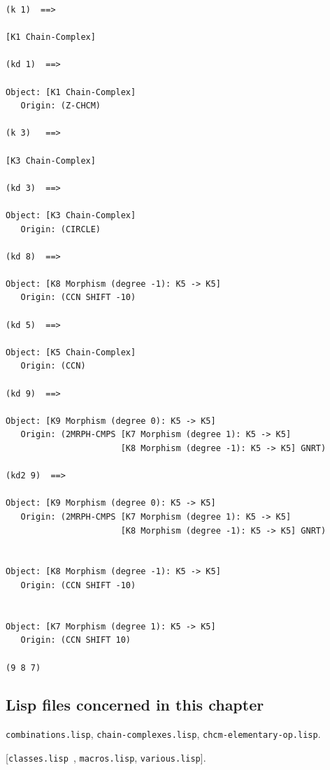 {\footnotesize\begin{verbatim}
(k 1)  ==>

[K1 Chain-Complex]

(kd 1)  ==>

Object: [K1 Chain-Complex]
   Origin: (Z-CHCM)

(k 3)   ==>

[K3 Chain-Complex]

(kd 3)  ==>

Object: [K3 Chain-Complex]
   Origin: (CIRCLE)

(kd 8)  ==>

Object: [K8 Morphism (degree -1): K5 -> K5]
   Origin: (CCN SHIFT -10)

(kd 5)  ==>

Object: [K5 Chain-Complex]
   Origin: (CCN)

(kd 9)  ==>

Object: [K9 Morphism (degree 0): K5 -> K5]
   Origin: (2MRPH-CMPS [K7 Morphism (degree 1): K5 -> K5] 
                       [K8 Morphism (degree -1): K5 -> K5] GNRT)

(kd2 9)  ==>

Object: [K9 Morphism (degree 0): K5 -> K5]
   Origin: (2MRPH-CMPS [K7 Morphism (degree 1): K5 -> K5] 
                       [K8 Morphism (degree -1): K5 -> K5] GNRT)


Object: [K8 Morphism (degree -1): K5 -> K5]
   Origin: (CCN SHIFT -10)


Object: [K7 Morphism (degree 1): K5 -> K5]
   Origin: (CCN SHIFT 10)

(9 8 7)
\end{verbatim}}

\subsection* {Lisp files concerned in this chapter}

{\tt combinations.lisp}, {\tt chain-complexes.lisp},
{\tt chcm-elementary-op.lisp}. \par

[{\tt classes.lisp }, {\tt macros.lisp}, {\tt various.lisp}].
